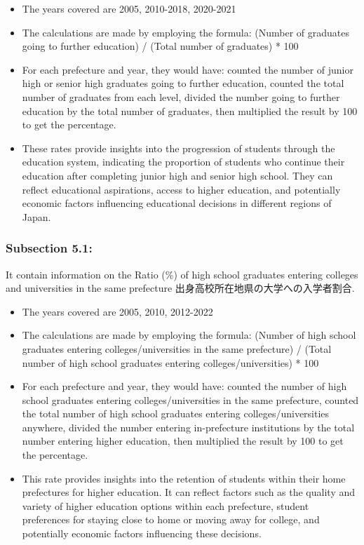 \documentclass[
]{ltjarticle}
\begin{document}
\begin{itemize}
\item
  The years covered are 2005, 2010-2018, 2020-2021
\item
  The calculations are made by employing the formula: (Number of
  graduates going to further education) / (Total number of graduates) *
  100
\item
  For each prefecture and year, they would have: counted the number of
  junior high or senior high graduates going to further education,
  counted the total number of graduates from each level, divided the
  number going to further education by the total number of graduates,
  then multiplied the result by 100 to get the percentage.
\item
  These rates provide insights into the progression of students through
  the education system, indicating the proportion of students who
  continue their education after completing junior high and senior high
  school. They can reflect educational aspirations, access to higher
  education, and potentially economic factors influencing educational
  decisions in different regions of Japan.
\end{itemize}

\hypertarget{subsection-5.1}{%
\subsubsection{Subsection 5.1:}\label{subsection-5.1}}

It contain information on the Ratio (\%) of high school graduates
entering colleges and universities in the same prefecture
出身高校所在地県の大学への入学者割合.

\begin{itemize}
\item
  The years covered are 2005, 2010, 2012-2022
\item
  The calculations are made by employing the formula: (Number of high
  school graduates entering colleges/universities in the same
  prefecture) / (Total number of high school graduates entering
  colleges/universities) * 100
\item
  For each prefecture and year, they would have: counted the number of
  high school graduates entering colleges/universities in the same
  prefecture, counted the total number of high school graduates entering
  colleges/universities anywhere, divided the number entering
  in-prefecture institutions by the total number entering higher
  education, then multiplied the result by 100 to get the percentage.
\item
  This rate provides insights into the retention of students within
  their home prefectures for higher education. It can reflect factors
  such as the quality and variety of higher education options within
  each prefecture, student preferences for staying close to home or
  moving away for college, and potentially economic factors influencing
  these decisions.
\end{itemize}
\end{document}

